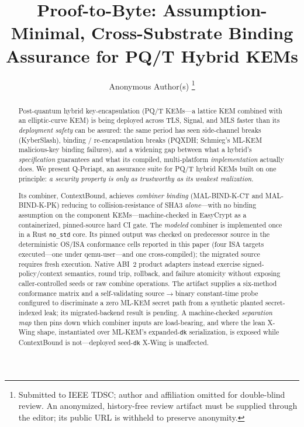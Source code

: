 \documentclass[journal]{IEEEtran}
\newcommand{\code}[1]{\texttt{\small #1}}
\begin{document}
\title{Proof-to-Byte: Assumption-Minimal, Cross-Substrate Binding Assurance for PQ/T Hybrid KEMs}
\author{Anonymous Author(s)%
\thanks{Submitted to IEEE TDSC; author and affiliation omitted for double-blind review.
An anonymized, history-free review artifact must be supplied through the editor; its public URL is
withheld to preserve anonymity.}}
\maketitle

\begin{abstract}
Post-quantum hybrid key-encapsulation (PQ/T KEMs---a lattice KEM combined with an elliptic-curve
KEM) is being deployed across TLS, Signal, and MLS faster than its \emph{deployment safety} can be
assured: the same period has seen side-channel breaks (KyberSlash), binding / re-encapsulation
breaks (PQXDH; Schmieg's ML-KEM malicious-key binding failures), and a widening gap between what a
hybrid's \emph{specification} guarantees and what its compiled, multi-platform \emph{implementation}
actually does. We present Q-Periapt, an assurance suite for PQ/T hybrid KEMs built on one principle:
\emph{a security property is only as trustworthy as its weakest realization}.

Its combiner, ContextBound, achieves \emph{combiner binding} (\mbox{MAL-BIND-K-CT} and
\mbox{MAL-BIND-K-PK}) reducing to collision-resistance of SHA3 \emph{alone}---with no binding
assumption on the component KEMs---machine-checked in EasyCrypt as a containerized,
pinned-source hard CI gate. The
\emph{modeled} combiner is implemented once in a Rust \code{no\_std} core. Its pinned output
was checked on predecessor source in the deterministic OS/ISA conformance cells reported in this
paper (four ISA targets executed---one under qemu-user---and one cross-compiled); the migrated source
requires fresh execution. Native ABI~2 product adapters instead exercise signed-policy/context
semantics, round trip, rollback, and failure atomicity without exposing caller-controlled seeds or
raw combine operations. The artifact supplies a six-method conformance matrix and a self-validating
source$\to$binary constant-time probe configured to discriminate a zero ML-KEM secret path from a
synthetic planted secret-indexed leak; its migrated-backend result is pending. A
machine-checked \emph{separation map} then pins down which combiner inputs are load-bearing, and
where the lean X-Wing shape, instantiated over ML-KEM's expanded-\code{dk} serialization, is exposed
while ContextBound is not---deployed seed-\code{dk} X-Wing is unaffected.


\end{abstract}
\end{document}
